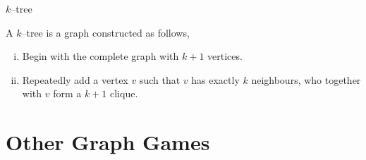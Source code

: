 \documentclass{beamer}
\begin{document}
\begin{frame}{\secname}{$k$--tree}
    
    
    
    A $k$--tree is a graph constructed as follows,
    \begin{enumerate}[(i)]
        \item Begin with the complete graph with $k+1$ vertices.
        \item Repeatedly add a vertex $v$ such that $v$ has exactly $k$ neighbours, who together with $v$ form a $k+1$ clique.
    \end{enumerate}
    
\end{frame}



\section{Other Graph Games}

\end{document}
